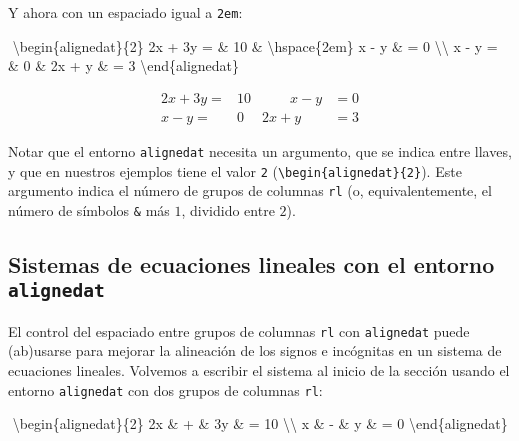 \documentclass[
  letterpaper,
  DIV=11,
  numbers=noendperiod]{scrartcl}
\newenvironment{Shaded}{\begin{snugshade}}{\end{snugshade}}
\newcommand{\ExtensionTok}[1]{\textcolor[rgb]{0.00,0.23,0.31}{#1}}
\newcommand{\KeywordTok}[1]{\textcolor[rgb]{0.00,0.23,0.31}{#1}}
\newcommand{\NormalTok}[1]{\textcolor[rgb]{0.00,0.23,0.31}{#1}}
\newcommand{\SpecialCharTok}[1]{\textcolor[rgb]{0.37,0.37,0.37}{#1}}
\newcommand{\SpecialStringTok}[1]{\textcolor[rgb]{0.13,0.47,0.30}{#1}}
\begin{document}
Y ahora con un espaciado igual a \texttt{2em}:

\begin{Shaded}
\begin{Highlighting}[]
\SpecialStringTok{$$}
\KeywordTok{\textbackslash{}begin}\NormalTok{\{}\ExtensionTok{alignedat}\NormalTok{\}}\SpecialStringTok{\{2\} }
\SpecialStringTok{2x + 3y  = \& 10   \&  }\SpecialCharTok{\textbackslash{}hspace}\SpecialStringTok{\{2em\}   x {-} y \& = 0 }\SpecialCharTok{\textbackslash{}\textbackslash{}}
\SpecialStringTok{  x {-} y  = \& 0    \&   2x + y \& = 3}
\KeywordTok{\textbackslash{}end}\NormalTok{\{}\ExtensionTok{alignedat}\NormalTok{\}}
\SpecialStringTok{$$}
\end{Highlighting}
\end{Shaded}

\[
\begin{alignedat}{2} 
2x + 3y  = & 10   &  \hspace{2em}   x - y & = 0 \\
  x - y  = & 0    &   2x + y & = 3
\end{alignedat}
\]

Notar que el entorno \texttt{alignedat} necesita un argumento, que se
indica entre llaves, y que en nuestros ejemplos tiene el valor
\texttt{2} (\texttt{\textbackslash{}begin\{alignedat\}\{2\}}). Este
argumento indica el número de grupos de columnas \texttt{rl} (o,
equivalentemente, el número de símbolos \texttt{\&} más \(1\), dividido
entre \(2\)).

\hypertarget{sistemas-de-ecuaciones-lineales-con-el-entorno-alignedat}{%
\subsection{\texorpdfstring{Sistemas de ecuaciones lineales con el
entorno
\texttt{alignedat}}{Sistemas de ecuaciones lineales con el entorno alignedat}}\label{sistemas-de-ecuaciones-lineales-con-el-entorno-alignedat}}

El control del espaciado entre grupos de columnas \texttt{rl} con
\texttt{alignedat} puede (ab)usarse para mejorar la alineación de los
signos e incógnitas en un sistema de ecuaciones lineales. Volvemos a
escribir el sistema al inicio de la sección usando el entorno
\texttt{alignedat} con dos grupos de columnas \texttt{rl}:

\begin{Shaded}
\begin{Highlighting}[]
\SpecialStringTok{$$}
\KeywordTok{\textbackslash{}begin}\NormalTok{\{}\ExtensionTok{alignedat}\NormalTok{\}}\SpecialStringTok{\{2\} }
\SpecialStringTok{2x \& +    \& 3y \& =  10 }\SpecialCharTok{\textbackslash{}\textbackslash{}}\SpecialStringTok{ }
\SpecialStringTok{ x \& {-}    \&  y \& =  0 }
\KeywordTok{\textbackslash{}end}\NormalTok{\{}\ExtensionTok{alignedat}\NormalTok{\}}
\SpecialStringTok{$$}
\end{Highlighting}
\end{Shaded}
\end{document}

